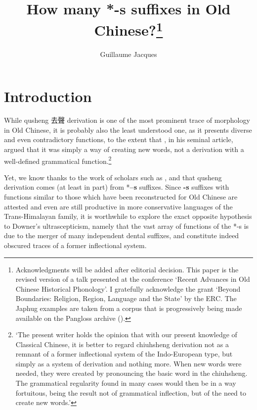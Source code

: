 \documentclass[oneside,a4paper,11pt]{article}
\newcommand{\ipa}[1]{{\phon\textbf{\mbox{#1}}}}
\newcommand{\zh}[1]{{\cn#1}}
\begin{document}
 
\title{How many *-s suffixes in Old Chinese?\footnote{Acknowledgments will be added after editorial decision. This paper is the revised version of a talk presented at the conference `Recent Advances in Old Chinese Historical Phonology'. I gratefully acknowledge the grant `Beyond Boundaries: Religion, Region, Language and the State' by the ERC. The Japhug examples are taken from a corpus that is progressively being made available on the Pangloss archive (\citealt{michailovsky14pangloss}).} } %
\author{Guillaume Jacques}
\maketitle
 
\section{Introduction}
While qusheng \zh{去聲} derivation is one of the most prominent trace of morphology in Old Chinese, it is probably also the least understood one, as it presents diverse and even contradictory functions, to the extent that \citet[262]{downer59}, in his seminal article, argued that it was simply a way of creating new words, not a derivation with a well-defined grammatical function.\footnote{`The present writer holds the opinion that with our present knowledge of Classical Chinese, it is better to regard chiuhsheng derivation not as a remnant of a former inflectional system of the Indo-European type, but simply as a system of derivation and nothing more. When new words were needed, they were created by pronouncing the basic word in the chiuhsheng. The grammatical regularity found in many cases would then be in a way fortuitous, being the result not of grammatical inflection, but of the need to create new words.'}
 
Yet, we know thanks to the work of scholars such as \citet{haudricourt54chinois}, \citet{forrest60occlusives, schuessler85qusheng} and \citet{sagart99roc} that qusheng derivation comes (at least in part) from *\ipa{--s} suffixes. Since \ipa{-s} suffixes with functions similar to those which have been reconstructed for Old Chinese are attested and even are still productive in more conservative languages of the Trans-Himalayan family, it is worthwhile to explore the exact opposite hypothesis to Downer's ultrascepticism, namely that the vast array of functions of the *-s is due to the merger of many independent dental suffixes, and constitute indeed obscured traces of a former inflectional system.
\end{document}
